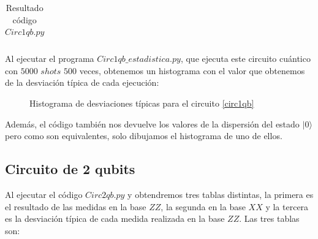 \documentclass[11pt, a4paper, twocolumn]{article}
\begin{document}
\begin{table}
\begin{tabular}{cccccccccc}
\end{tabular}
\caption{Resultado código $Circ1qb.py$ }

\label{tab: TablaCirc1qb}
\end{table}

\newpage

Al ejecutar el programa $Circ1qb\_estadistica.py$, que ejecuta este circuito cuántico con $5000$ $shots$ 
$500$ veces, obtenemos un histograma con el valor que obtenemos de la desviación
típica de cada ejecución:


\begin{figure}[h!]
	\centering
	
	\caption{Histograma de desviaciones típicas para el circuito \ref{circ1qb}}
	\label{HistogramaCirc1qb}
\end{figure}

\newpage

Además, el código también nos devuelve los valores de la dispersión del estado $|0\rangle$
pero como son equivalentes, solo dibujamos el histograma de uno de ellos.

\subsection{Circuito de 2 qubits}

Al ejecutar el código $Circ2qb.py$ y obtendremos tres tablas distintas, la primera
es el resultado de las medidas en la base $ZZ$, la segunda en la base $XX$ y 
la tercera es la desviación típica de cada medida realizada en la base $ZZ$.
Las tres tablas son:
\end{document}
